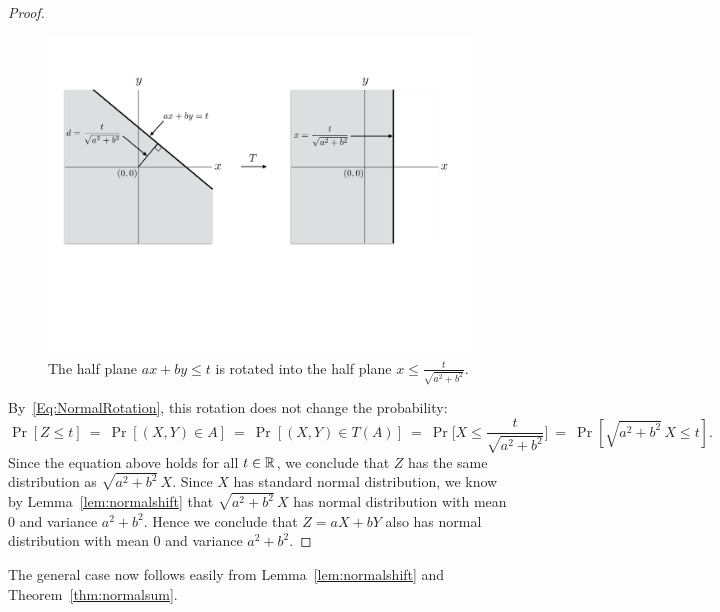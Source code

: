 \documentclass[11pt]{article}
\newcounter{thm}
\begin{document}
\begin{proof}
\begin{figure}[h!]
\centering
\includegraphics[scale=0.35]{normalrotation}
\caption{The half plane $ax+by \le t$ is rotated into the half plane $x \le \frac{t}{\sqrt{a^2+b^2}}$.}
\label{fig:normalrotation}
\end{figure}

By~\eqref{Eq:NormalRotation}, this rotation does not change the probability:
$$\Pr[Z \le t] ~=~ \Pr[(X,Y) \in A] ~=~ \Pr[(X,Y) \in T(A)] ~=~ \Pr\Big[X \le \frac{t}{\sqrt{a^2+b^2}} \Big] ~=~ \Pr[\sqrt{a^2+b^2} \, X \le t].$$
Since the equation above holds for all $t \in \mathbb{R}$, we conclude that $Z $ has the same distribution as $\sqrt{a^2+b^2} \, X$. Since $X$ has standard normal distribution, we know by Lemma~\ref{lem:normalshift} that $\sqrt{a^2 + b^2} \, X$ has normal distribution with mean $0$ and variance $a^2+b^2$. Hence we conclude that $Z = aX + bY$ also has normal distribution with mean $0$ and variance $a^2+b^2$.
\end{proof}


The general case now follows easily from Lemma~\ref{lem:normalshift} and Theorem~\ref{thm:normalsum}.
\end{document}
